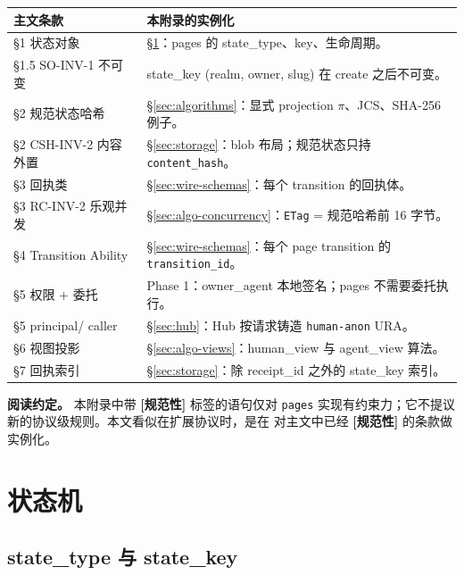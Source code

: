 \documentclass[11pt,a4paper]{article}
\newcommand{\normsv}{\textcolor{normativecolor}{\textbf{[规范性]}}\xspace}
\theoremstyle{definition}
\begin{document}
\begin{center}
\renewcommand{\arraystretch}{1.2}
\begin{tabularx}{\linewidth}{l X}
\toprule
\textbf{主文条款} & \textbf{本附录的实例化} \\
\midrule
\S1 状态对象               & \S\ref{sec:state-machine}：pages 的 state\_type、key、生命周期。 \\
\S1.5 SO-INV-1 不可变      & state\_key (realm, owner, slug) 在 create 之后不可变。 \\
\S2 规范状态哈希           & \S\ref{sec:algorithms}：显式 projection $\pi$、JCS、SHA-256 例子。 \\
\S2 CSH-INV-2 内容外置     & \S\ref{sec:storage}：blob 布局；规范状态只持 \texttt{content\_hash}。 \\
\S3 回执类                 & \S\ref{sec:wire-schemas}：每个 transition 的回执体。 \\
\S3 RC-INV-2 乐观并发      & \S\ref{sec:algo-concurrency}：\texttt{ETag} = 规范哈希前 16 字节。 \\
\S4 Transition Ability     & \S\ref{sec:wire-schemas}：每个 page transition 的 \texttt{transition\_id}。 \\
\S5 权限 + 委托            & Phase 1：owner\_agent 本地签名；pages 不需要委托执行。 \\
\S5 principal/ caller      & \S\ref{sec:hub}：Hub 按请求铸造 \texttt{human-anon} URA。 \\
\S6 视图投影               & \S\ref{sec:algo-views}：human\_view 与 agent\_view 算法。 \\
\S7 回执索引               & \S\ref{sec:storage}：除 receipt\_id 之外的 state\_key 索引。 \\
\bottomrule
\end{tabularx}
\end{center}

\textbf{阅读约定。} 本附录中带 \normsv{} 标签的语句仅对 \texttt{pages}
实现有约束力；它不提议新的协议级规则。本文看似在扩展协议时，是在
对主文中已经 \normsv{} 的条款做实例化。

\section{状态机}
\label{sec:state-machine}

\subsection{state\_type 与 state\_key}
\end{document}
